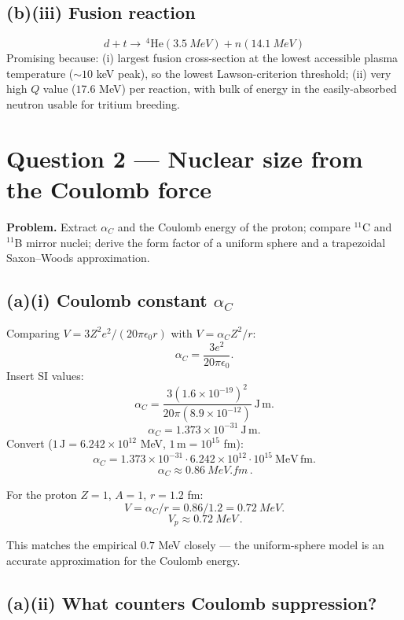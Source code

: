 \documentclass[11pt]{article}
\begin{document}
\subsection*{(b)(iii) Fusion reaction}

\[ \boxed{\,d + t \to \,^4\mathrm{He}(\SI{3.5}{MeV}) + n(\SI{14.1}{MeV})\,} \]
Promising because: (i) largest fusion cross-section at the lowest accessible plasma temperature ($\sim 10$ keV peak), so the lowest Lawson-criterion threshold; (ii) very high $Q$ value ($17.6$ MeV) per reaction, with bulk of energy in the easily-absorbed neutron usable for tritium breeding.

\section*{Question 2 --- Nuclear size from the Coulomb force}

\textbf{Problem.} Extract $\alpha_C$ and the Coulomb energy of the proton; compare $^{11}$C and $^{11}$B mirror nuclei; derive the form factor of a uniform sphere and a trapezoidal Saxon--Woods approximation.

\subsection*{(a)(i) Coulomb constant $\alpha_C$}

Comparing $V=3Z^2 e^2/(20\pi\epsilon_0 r)$ with $V=\alpha_C Z^2/r$:
\[ \alpha_C = \frac{3 e^2}{20\pi\epsilon_0}. \]
Insert SI values:
\[ \alpha_C = \frac{3 (1.6\times 10^{-19})^2}{20\pi (8.9\times 10^{-12})}\ \mathrm{J\,m}. \]
\[ \alpha_C = 1.373\times 10^{-31}\ \mathrm{J\,m}. \]
Convert ($1\,\mathrm{J}=6.242\times 10^{12}$ MeV, $1\,\mathrm{m}=10^{15}$ fm):
\[ \alpha_C = 1.373\times 10^{-31}\cdot 6.242\times 10^{12}\cdot 10^{15}\ \mathrm{MeV\,fm}. \]
\[ \boxed{\,\alpha_C \approx \SI{0.86}{MeV.fm}\,}. \]

For the proton $Z=1$, $A=1$, $r=1.2$ fm:
\[ V = \alpha_C / r = 0.86/1.2 = \SI{0.72}{MeV}. \]
\[ \boxed{\,V_p \approx \SI{0.72}{MeV}\,}. \]

This matches the empirical $0.7$ MeV closely --- the uniform-sphere model is an accurate approximation for the Coulomb energy.

\subsection*{(a)(ii) What counters Coulomb suppression?}
\end{document}
